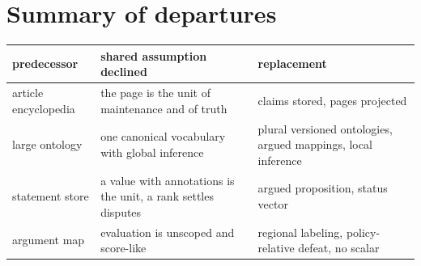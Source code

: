 \section{Summary of departures}\label{sec:departures}

\begin{center}
\small
\begin{tabularx}{\textwidth}{@{}l X X@{}}
\toprule
predecessor & shared assumption declined & replacement\\
\midrule
article encyclopedia & the page is the unit of maintenance and of truth & claims stored, pages projected\\
large ontology & one canonical vocabulary with global inference & plural versioned ontologies, argued mappings, local inference\\
statement store & a value with annotations is the unit, a rank settles disputes & argued proposition, status vector\\
argument map & evaluation is unscoped and score-like & regional labeling, policy-relative defeat, no scalar\\
\bottomrule
\end{tabularx}
\end{center}

